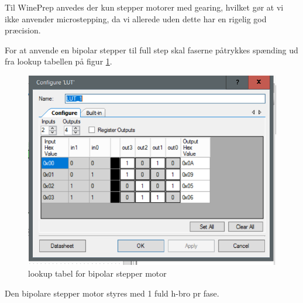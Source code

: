 Til WinePrep anvedes der kun stepper motorer med gearing, hvilket gør at vi ikke anvender microstepping, da vi allerede uden dette har en rigelig god præcision.

For at anvende en bipolar stepper til full step skal faserne påtrykkes spænding ud fra lookup tabellen på figur \ref{lookuptabel}.

\begin{figure}[H]
	\centering
	\includegraphics{billeder/lookup}
	\caption{lookup tabel for bipolar stepper motor}
	\label{lookuptabel}
\end{figure}

Den bipolare stepper motor styres med 1 fuld h-bro pr fase. 